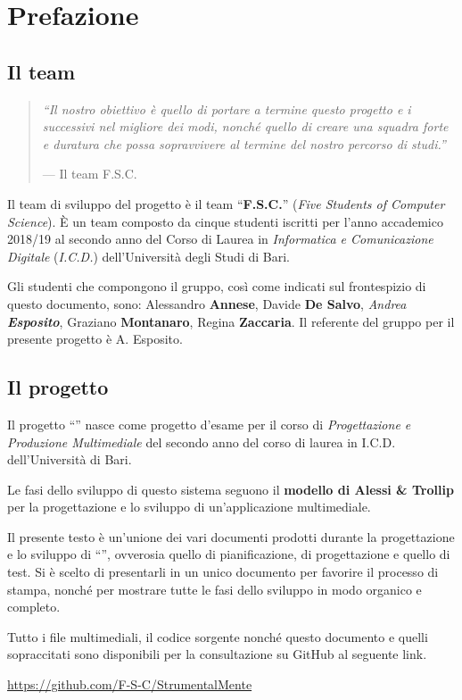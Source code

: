\chapter*{Prefazione}
\section*{Il team}

\begin{quote}
\flushright \emph{``Il nostro obiettivo è quello di portare a termine questo progetto e i successivi nel migliore dei modi, nonché quello di creare una squadra forte e duratura che possa sopravvivere al termine del nostro percorso di studi.''}

--- Il team F.S.C.
\end{quote}

Il team di sviluppo del progetto è il team ``\textbf{F.S.C.}'' (\emph{Five
Students of Computer Science}). È un team composto da cinque studenti iscritti
per l'anno accademico 2018/19 al secondo anno del Corso di Laurea in
\emph{Informatica e Comunicazione Digitale} (\emph{I.C.D.}) dell'Università
degli Studi di Bari. 

Gli studenti che compongono il gruppo, così come indicati sul frontespizio di
questo documento, sono: Alessandro \textbf{Annese}, Davide \textbf{De Salvo},
\emph{Andrea \textbf{Esposito}}, Graziano \textbf{Montanaro}, Regina
\textbf{Zaccaria}. Il referente del gruppo per il presente progetto è A.
Esposito.

\section*{Il progetto}
Il progetto ``\ProjectTitle{}'' nasce come progetto d'esame per il corso di
\emph{Progettazione e Produzione Multimediale} del secondo anno del corso di
laurea in I.C.D. dell'Università di Bari.

Le fasi dello sviluppo di questo sistema seguono il \textbf{modello di Alessi \&
Trollip} per la progettazione e lo sviluppo di un'applicazione multimediale.

Il presente testo è un'unione dei vari documenti prodotti durante la
progettazione e lo sviluppo di ``\ProjectTitle{}'', ovverosia quello di
pianificazione, di progettazione e quello di test. Si è scelto di presentarli in
un unico documento per favorire il processo di stampa, nonché per mostrare tutte
le fasi dello sviluppo in modo organico e completo.

Tutto i file multimediali, il codice sorgente nonché questo documento e quelli
sopraccitati sono disponibili per la consultazione su GitHub al seguente link.

\begin{center}
	\url{https://github.com/F-S-C/StrumentalMente}
\end{center}
